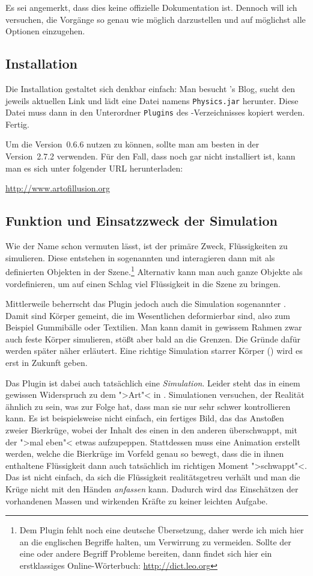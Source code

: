 \documentclass[10pt,DIV=14,a4paper]{scrartcl}
\begin{document}
Es sei angemerkt, dass dies keine offizielle Dokumentation ist. Dennoch
will ich versuchen, die Vorgänge so genau wie möglich darzustellen und
auf möglichst alle Optionen einzugehen.

\subsection{Installation}
Die Installation gestaltet sich denkbar einfach: Man besucht \deltor's
Blog, sucht den jeweils aktuellen Link und lädt eine Datei namens
\texttt{Physics.jar} herunter. Diese Datei muss dann in den Unterordner
\texttt{Plugins} des \aoi-Verzeichnisses kopiert werden. Fertig.

Um die Version~0.6.6 nutzen zu können, sollte man am besten \aoi
in der Version~2.7.2 verwenden. Für den Fall, dass \aoi noch gar nicht
installiert ist, kann man es sich unter folgender URL herunterladen:

\url{http://www.artofillusion.org}

\subsection{Funktion und Einsatzzweck der Simulation}
Wie der Name schon vermuten lässt, ist der primäre Zweck, Flüssigkeiten
zu simulieren. Diese entstehen in sogenannten  und
interagieren dann mit als  definierten Objekten in der
Szene.\footnote{Dem Plugin fehlt noch eine deutsche Übersetzung, daher
werde ich mich hier an die englischen Begriffe halten, um Verwirrung zu
vermeiden. Sollte der eine oder andere Begriff Probleme bereiten, dann
findet sich hier ein erstklassiges Online-Wörterbuch:
\url{http://dict.leo.org}} Alternativ kann man auch ganze Objekte
als  vordefinieren, um auf einen Schlag viel Flüssigkeit in die
Szene zu bringen.

Mittlerweile beherrscht das Plugin jedoch auch die Simulation
sogenannter . Damit sind Körper gemeint, die im
Wesentlichen deformierbar sind, also zum Beispiel Gummibälle oder
Textilien. Man kann damit in gewissem Rahmen zwar auch feste Körper
simulieren, stößt aber bald an die Grenzen. Die Gründe dafür werden
später näher erläutert. Eine richtige Simulation starrer Körper
() wird es erst in Zukunft geben.

Das Plugin ist dabei auch tatsächlich eine \emph{Simulation}. Leider
steht das in einem gewissen Widerspruch zu dem ">Art"< in \aoi.
Simulationen versuchen, der Realität ähnlich zu sein, was zur Folge hat,
dass man sie nur sehr schwer kontrollieren kann. Es ist beispielsweise
nicht einfach, ein fertiges Bild, das das Anstoßen zweier Bierkrüge,
wobei der Inhalt des einen in den anderen überschwappt, mit der
\fluidsim ">mal eben"< etwas aufzupeppen. Stattdessen muss eine
Animation erstellt werden, welche die Bierkrüge im Vorfeld genau so
bewegt, dass die in ihnen enthaltene Flüssigkeit dann auch tatsächlich
im richtigen Moment ">schwappt"<.  Das ist nicht einfach, da sich die
Flüssigkeit realitätsgetreu verhält und man die Krüge nicht mit den
Händen \emph{anfassen} kann. Dadurch wird das Einschätzen der
vorhandenen Massen und wirkenden Kräfte zu keiner leichten Aufgabe.
\end{document}
